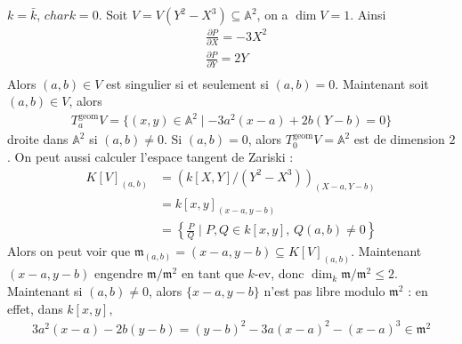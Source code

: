             \begin{expl}
                $k = \bar k$, $char k = 0$. Soit $V = V(Y^2 - X^3) \subseteq \mathbb{A}^2$, on a $\dim V = 1$. Ainsi
                \begin{align*}
                    &\frac{\partial P}{\partial X} = -3X^2 \\
                    &\frac{\partial P}{\partial Y} = 2Y \\
                \end{align*}
                Alors $(a,b) \in V$ est singulier si et seulement si $(a,b) = 0$. Maintenant soit $(a,b) \in V$, alors
                \begin{align*}
                    T_a^\mathrm{geom}V = \{(x,y) \in \mathbb{A}^2 \mid -3a^2(x-a) + 2b(Y - b) = 0\}
                \end{align*}
                droite dans $\mathbb{A}^2$ si $(a,b) \neq 0$. Si $(a,b) = 0$, alors $T_0^\mathrm{geom}V = \mathbb{A}^2$ est de dimension $2$. On peut aussi calculer l'espace tangent de Zariski :
                \begin{align*}
                    K[V]_{(a,b)} &= \left( k[X,Y]/(Y^2 - X^3) \right)_{(X-a, Y-b)} \\
                    &= k[x,y]_{(x-a, y-b)} \\ 
                    &= \left\{ \frac PQ \mid P,Q \in k[x,y],\, Q(a,b) \neq 0 \right\}
                \end{align*}
                Alors on peut voir que $\mathfrak{m}_{(a,b)} = (x-a,y-b) \subseteq K[V]_{(a,b)}$. Maintenant $(x-a, y-b)$ engendre $\mathfrak{m}/\mathfrak{m}^2$ en tant que $k$-ev, donc $\dim_k \mathfrak{m}/\mathfrak{m}^2 \leq 2$. Maintenant si $(a,b) \neq 0$, alors $\{x-a, y-b\}$ n'est pas libre modulo $\mathfrak{m}^2$ : en effet, dans $k[x,y]$,
                \begin{align*}
                    3a^2(x-a) - 2b(y-b) = (y - b)^2 - 3a(x - a)^2 - (x - a) ^3 \in \mathfrak{m}^2

\end{align*}
\end{expl}
